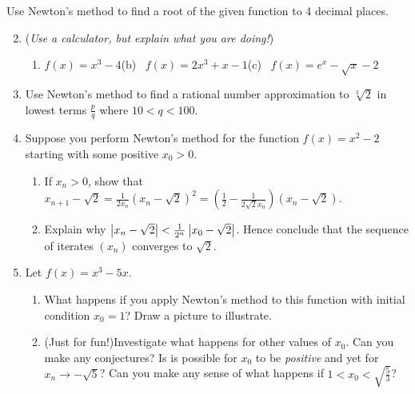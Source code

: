 \begin{exercises}{}{}
	\exstart Use Newton's method to find a root of the given function to 4 decimal places.\vspace{-5pt}
	
	\begin{enumerate}\setcounter{enumi}{1}
  	\item[](\emph{Use a calculator, but explain what you are doing!})
  	\begin{enumerate}
    	\item $f(x)=x^3-4$\qquad (b) \ $f(x)=2x^3+x-1$\qquad (c) \ $f(x)=e^x-\sqrt x-2$
  	\end{enumerate}
  
  
  	\item Use Newton's method to find a rational number approximation to $\sqrt[3]{2}$ in lowest terms $\frac pq$ where $10<q<100$.
  
   
 
  	\item\label{exs:newtonconverge} Suppose you perform Newton's method for the function $f(x)=x^2-2$ starting with some positive $x_0>0$.
  	\begin{enumerate}
    	\item If $x_n>0$, show that $x_{n+1}-\sqrt 2=\frac 1{2x_n}(x_n-\sqrt 2)^2 =\left(\frac 12-\frac 1{2\sqrt 2x_n}\right)(x_n-\sqrt 2)$.
    	\item Explain why $\left| x_n-\sqrt 2\right|<\frac 1{2^n}\left| x_0-\sqrt 2\right|$. Hence conclude that the sequence of iterates $(x_n)$ converges to $\sqrt 2$.
  	\end{enumerate}
	
	
  	\item\label{exs:newtonbad} Let $f(x)=x^3-5x$.
  	\begin{enumerate}
   		\item What happens if you apply Newton's method to this function with initial condition $x_0=1$? Draw a picture to illustrate.

    	\item (Just for fun!)\lstsp Investigate what happens for other values of $x_0$. Can you make any conjectures? Is is possible for $x_0$ to be \emph{positive} and yet for $x_n\to-\sqrt 5$? Can you make any sense of what happens if $1<x_0<\sqrt{\frac 53}$?
  	\end{enumerate}
	\end{enumerate}

\end{exercises}
